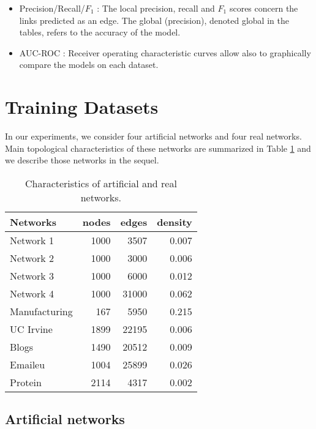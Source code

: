 \documentclass[a4paper, 12pt]{article}
\begin{document}
\begin{itemize}

\item Precision/Recall/$F_1$ :  The local precision, recall and $F_1$ scores concern the links predicted as an edge.  The global (precision), denoted global in the tables, refers to the accuracy of the model. 
\item AUC-ROC : Receiver operating characteristic curves allow also to graphically compare the  models on each dataset.
\end{itemize}

\section{Training Datasets}

In our experiments, we consider four artificial networks and four real networks.  Main topological characteristics of these networks are summarized in Table \ref{table:networks_measures} and we describe those networks in the sequel.

\begin{table}[h] 
	\centering
	\caption{Characteristics of artificial and real networks.}
    \begin{tabular}{lrrr}
        \hline
        \textbf{Networks} &   nodes &   edges &   density \\
        \hline
        Network 1 &    1000 &    3507 &     0.007 \\
        Network 2 &    1000 &    3000 &     0.006 \\
        Network 3 &    1000 &    6000 &     0.012 \\
        Network 4 &    1000 &   31000 &     0.062 \\
        Manufacturing &     167 &    5950 &     0.215 \\
        UC Irvine     &    1899 &   22195 &     0.006 \\
        Blogs         &    1490 &   20512 &     0.009 \\
        Emaileu       &    1004 &   25899 &     0.026 \\
        Protein       &    2114 &    4317 &     0.002 \\
    \hline
    \end{tabular}
	\label{table:networks_measures}
\end{table}



\subsection{Artificial networks}
\end{document}
